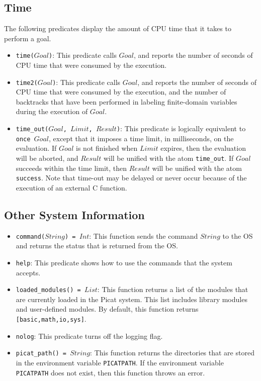 \subsection{Time}
The following predicates display the amount of CPU time that it takes to perform a goal.
\begin{itemize}
\item \texttt{time($Goal$)}: This predicate calls $Goal$, and reports the number of seconds of CPU time that were consumed by the execution.
\item \texttt{time2($Goal$)}: This predicate calls $Goal$, and reports the number of seconds of CPU time that were consumed by the execution, and the number of backtracks that have been performed in labeling finite-domain variables during the execution of $Goal$.
\item \texttt{time\_out($Goal$, $Limit$, $Result$)}: This predicate is logically equivalent to \texttt{once $Goal$}, except that it imposes a time limit, in milliseconds, on the evaluation.  If $Goal$ is not finished when $Limit$ expires, then the evaluation will be aborted, and $Result$ will be unified with the atom \texttt{time\_out}.  If $Goal$ succeeds within the time limit, then $Result$ will be unified with the atom \texttt{success}. Note that time-out may be delayed or never occur because of the execution of an external C function.
\end{itemize}

\subsection{Other System Information}
\begin{itemize}
\item \texttt{command($String$) = $Int$}: This function sends the command $String$ to the OS and returns the status that is returned from the OS.
\item \texttt{help}: This predicate shows how to use the commands that the system accepts.
\item \texttt{loaded\_modules() = $List$}: This function returns a list of the modules that are currently loaded in the Picat system.  This list includes library modules and user-defined modules.  By default, this function returns \texttt{[basic,math,io,sys]}.
\item \texttt{nolog}: This predicate turns off the logging flag.
\item \texttt{picat\_path() = $String$}: This function returns the directories that are stored in the environment variable \texttt{PICATPATH}.  If the environment variable \texttt{PICATPATH} does not exist, then this function throws an error.
\end{itemize}

